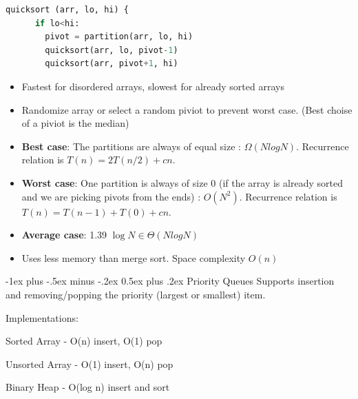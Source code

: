 \documentclass[letterpaper, 8pt]{extarticle}
\makeatletter
\renewcommand{\section}{\@startsection{section}{1}{0mm}%
                                {-1ex plus -.5ex minus -.2ex}%
                                {0.5ex plus .2ex}%
                                {\normalfont\normalsize\bfseries}}
\makeatother
\begin{document}
\begin{multicols*}{4}
\begin{lstlisting}[language=Python, breaklines=true, postbreak=\mbox{\textcolor{red}{$\hookrightarrow$}\space}]
    quicksort (arr, lo, hi) {
      if lo<hi:
        pivot = partition(arr, lo, hi)
        quicksort(arr, lo, pivot-1)
        quicksort(arr, pivot+1, hi)
  \end{lstlisting}
  \begin{itemize}
    \item Fastest for disordered arrays, slowest for already sorted arrays
    \item Randomize array or select a random piviot to prevent worst case. (Best choise of a piviot is the median)
    \item \textbf{Best case}: The partitions are always of equal size : $\Omega(NlogN)$. Recurrence relation is $T(n) = 2T(n/2) + cn$.
    \item \textbf{Worst case}: One partition is always of size 0 (if the array is already sorted and we are picking pivots from the ends) : $O(N^2)$. Recurrence relation is $T(n) = T(n - 1) + T(0) + cn$.
    \item \textbf{Average case}: 1.39 $\log{N} \in \Theta(NlogN)$
    \item Uses less memory than merge sort. Space complexity $O(n)$
  \end{itemize}

  \section{Priority Queues}
  Supports insertion and removing/popping the priority (largest or smallest) item.

  Implementations:
  \begin{list}{}{}
    \item Sorted Array - O(n) insert, O(1) pop
    \item Unsorted Array - O(1) insert, O(n) pop
    \item Binary Heap - O(log n) insert and sort
  \end{list}


\end{multicols*}
\end{document}
